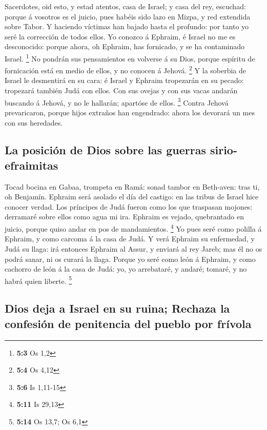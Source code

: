  Sacerdotes, oid esto, y estad atentos, casa de Israel; y
casa del rey, escuchad: porque á vosotros es el juicio, pues habéis sido
lazo en Mizpa, y red extendida sobre Tabor.  Y haciendo
víctimas han bajado hasta el profundo: por tanto yo seré la corrección
de todos ellos.  Yo conozco á Ephraim, é Israel no me es
desconocido: porque ahora, oh Ephraim, has fornicado, y se ha
contaminado Israel. \footnote{\textbf{5:3} Os 1,2}  No
pondrán sus pensamientos en volverse á su Dios, porque espíritu de
fornicación está en medio de ellos, y no conocen á Jehová. \footnote{\textbf{5:4}
  Os 4,12}  Y la soberbia de Israel le desmentirá en su
cara: é Israel y Ephraim tropezarán en su pecado: tropezará también Judá
con ellos.  Con sus ovejas y con sus vacas andarán
buscando á Jehová, y no le hallarán; apartóse de ellos. \footnote{\textbf{5:6}
  Is 1,11-15}  Contra Jehová prevaricaron, porque hijos
extraños han engendrado: ahora los devorará un mes con sus heredades.

\hypertarget{la-posiciuxf3n-de-dios-sobre-las-guerras-sirio-efraimitas}{%
\subsection{La posición de Dios sobre las guerras
sirio-efraimitas}\label{la-posiciuxf3n-de-dios-sobre-las-guerras-sirio-efraimitas}}

 Tocad bocina en Gabaa, trompeta en Ramá: sonad tambor en
Beth-aven: tras ti, oh Benjamín.  Ephraim será asolado el
día del castigo: en las tribus de Israel hice conocer verdad.
 Los príncipes de Judá fueron como los que traspasan
mojones: derramaré sobre ellos como agua mi ira.  Ephraim
es vejado, quebrantado en juicio, porque quiso andar en pos de
mandamientos. \footnote{\textbf{5:11} Is 29,13}  Yo pues
seré como polilla á Ephraim, y como carcoma á la casa de Judá.
 Y verá Ephraim su enfermedad, y Judá su llaga: irá
entonces Ephraim al Assur, y enviará al rey Jareb; mas él no os podrá
sanar, ni os curará la llaga.  Porque yo seré como león á
Ephraim, y como cachorro de león á la casa de Judá: yo, yo arrebataré, y
andaré; tomaré, y no habrá quien liberte. \footnote{\textbf{5:14} Os
  13,7; Os 6,1}

\hypertarget{dios-deja-a-israel-en-su-ruina-rechaza-la-confesiuxf3n-de-penitencia-del-pueblo-por-fruxedvola}{%
\subsection{Dios deja a Israel en su ruina; Rechaza la confesión de
penitencia del pueblo por
frívola}\label{dios-deja-a-israel-en-su-ruina-rechaza-la-confesiuxf3n-de-penitencia-del-pueblo-por-fruxedvola}}

